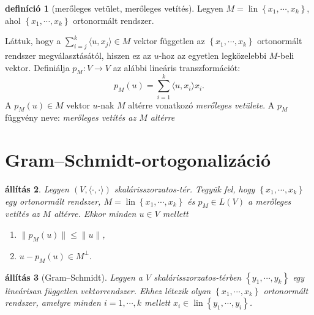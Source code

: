 \documentclass[9pt, a4paper, showtrims]{memoir}
\theoremstyle{plain}
\newtheorem{proposition}{állítás}[chapter]
\theoremstyle{remark}
\theoremstyle{definition}
\newtheorem{definition}[proposition]{definíció}
\DeclareMathOperator{\lin}{lin}
\newcommand{\ip}[2]{\langle#1,#2\rangle}
\begin{document}
\begin{definition}[merőleges vetület, merőleges vetítés]
    Legyen $M=\lin\left\{ x_1,\cdots,x_k \right\}$, 
    ahol $\left\{ x_1,\cdots,x_k \right\}$ ortonormált rendszer.

    Láttuk, hogy a 
    $\sum_{i=j}^k\ip{u}{x_j}\in M$ vektor független
    az $\left\{ x_1,\cdots,x_k \right\}$ ortonormált rendszer megválasztásától, hiszen
    ez az $u$-hoz az egyetlen legközelebbi $M$-beli vektor.
    Definiálja $p_M:V\to V$ az alábbi lineáris transzformációt:
    \[
        p_M\left( u \right)=
        \sum_{i=1}^k\ip{u}{x_i}x_i.
    \]
    A $p_M\left( u \right)\in M$ vektor $u$-nak $M$ altérre vonatkozó \emph{merőleges vetülete}.
    A $p_M$ függvény neve: \emph{merőleges vetítés az $M$ altérre}
\end{definition}


\section{Gram--Schmidt-ortogonalizáció}

\begin{proposition}
    Legyen $\left( V,\ip{\cdot}{\cdot} \right)$ skalárisszorzatos-tér.
    Tegyük fel, hogy $\left\{ x_1,\cdots,x_k \right\}$ egy ortonormált rendszer,
    $M=\lin\left\{ x_1,\cdots,x_k \right\}$
    és $p_M\in L\left( V \right)$ a merőleges vetítés az $M$ altérre.
    Ekkor minden $u\in V$ mellett
    \begin{enumerate}
        \item
            $\|p_M\left( u \right)\|\leq\|u\|$,
        \item
            \(
            u-p_M(u)\in M^\perp.
            \) 
            \qedhere
    \end{enumerate}
\end{proposition}

\begin{proposition}[Gram--Schmidt]
    Legyen a $V$ skalárisszorzatos-térben $\left\{ y_1,\cdots,y_k \right\}$ egy lineárisan független
    vektorrendszer. 
    Ehhez létezik olyan $\left\{ x_1,\cdots,x_k \right\}$ ortonormált rendszer, 
    amelyre minden $i=1,\cdots,k$ mellett $x_i\in\lin\left\{ y_1,\cdots,y_i \right\}$.
\end{proposition}
\end{document}
